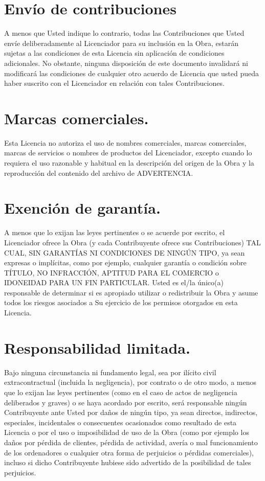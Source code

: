\section{Envío de contribuciones}A menos que Usted indique lo contrario, todas las Contribuciones que Usted envíe deliberadamente al Licenciador para su inclusión en la Obra, estarán sujetas a las condiciones de esta Licencia sin aplicación de condiciones adicionales. No obstante, ninguna disposición de este documento invalidará ni modificará las condiciones de cualquier otro acuerdo de Licencia que usted pueda haber suscrito con el Licenciador en relación con tales Contribuciones.
\section{Marcas comerciales.}Esta Licencia no autoriza el uso de nombres comerciales, marcas comerciales, marcas de servicios o nombres de productos del Licenciador, excepto cuando lo requiera el uso razonable y habitual en la descripción del origen de la Obra y la reproducción del contenido del archivo de ADVERTENCIA.
\section{Exención de garantía.}A menos que lo exijan las leyes pertinentes o se acuerde por escrito, el Licenciador ofrece la Obra (y cada Contribuyente ofrece sus Contribuciones) TAL CUAL, SIN GARANTÍAS NI CONDICIONES DE NINGÚN TIPO, ya sean expresas o implícitas, como por ejemplo, cualquier garantía o condición sobre TÍTULO, NO INFRACCIÓN, APTITUD PARA EL COMERCIO o IDONEIDAD PARA UN FIN PARTICULAR. Usted es el/la único(a) responsable de determinar si es apropiado utilizar o redistribuir la Obra y asume todos los riesgos asociados a Su ejercicio de los permisos otorgados en esta Licencia.
\section{Responsabilidad limitada.}Bajo ninguna circunstancia ni fundamento legal, sea por ilícito civil extracontractual (incluida la negligencia), por contrato o de otro modo, a menos que lo exijan las leyes pertinentes (como en el caso de actos de negligencia deliberados y graves) o se haya acordado por escrito, será responsable ningún Contribuyente ante Usted por daños de ningún tipo, ya sean directos, indirectos, especiales, incidentales o consecuentes ocasionados como resultado de esta Licencia o por el uso o imposibilidad de uso de la Obra (como por ejemplo los daños por pérdida de clientes, pérdida de actividad, avería o mal funcionamiento de los ordenadores o cualquier otra forma de perjuicios o pérdidas comerciales), incluso si dicho Contribuyente hubiese sido advertido de la posibilidad de tales perjuicios.
 \newpage
